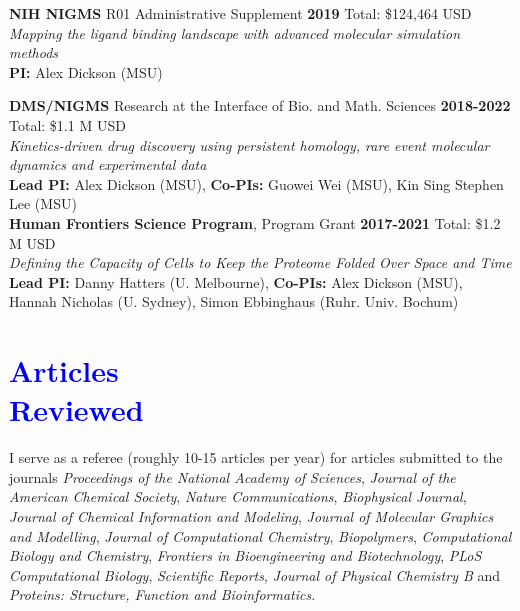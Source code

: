 \documentclass[margin,line]{res}
\begin{document}
\begin{resume}
{\bf NIH NIGMS} R01 Administrative Supplement \hfill {\bf 2019} Total: \$124,464 USD \\
\emph{Mapping the ligand binding landscape with advanced molecular simulation methods}\\
{\bf PI:} Alex Dickson (MSU)

{\bf DMS/NIGMS} Research at the Interface of Bio. and Math. Sciences \hfill {\bf 2018-2022} Total: \$1.1 M USD \\
 \emph{Kinetics-driven drug discovery using persistent homology, rare event molecular dynamics and experimental data}\\
 {\bf Lead PI:} Alex Dickson (MSU), {\bf Co-PIs:} Guowei Wei (MSU), Kin Sing Stephen Lee (MSU)\\

{\bf Human Frontiers Science Program}, Program Grant \hfill {\bf 2017-2021} Total: \$1.2 M USD \\
 \emph{Defining the Capacity of Cells to Keep the Proteome Folded Over Space and Time}\\
 {\bf Lead PI:} Danny Hatters (U. Melbourne), {\bf Co-PIs:} Alex Dickson (MSU), Hannah Nicholas (U. Sydney), Simon Ebbinghaus (Ruhr. Univ. Bochum) \\

\section{\sc \textcolor{blue}{ Articles \\ Reviewed}}
I serve as a referee (roughly 10-15 articles per year) for articles submitted to the journals \textit{Proceedings of the National Academy of Sciences}, \textit{Journal of the American Chemical Society}, \textit{Nature Communications}, \textit{Biophysical Journal}, \textit{Journal of Chemical Information and Modeling}, \textit{Journal of Molecular Graphics and Modelling}, \textit{Journal of Computational Chemistry}, \textit{Biopolymers}, \textit{Computational Biology and Chemistry}, \textit{Frontiers in Bioengineering and Biotechnology}, \textit{PLoS Computational Biology}, \textit{Scientific Reports}, \textit{Journal of Physical Chemistry B} and \textit{Proteins: Structure, Function and Bioinformatics}.


\end{resume}
\end{document}

